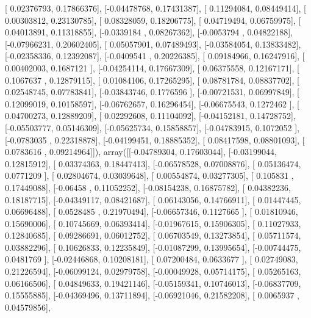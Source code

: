 \documentclass{article}
\begin{document}
       [ 0.02376793,  0.17866376],
       [-0.04478768,  0.17431387],
       [ 0.11294084,  0.08449414],
       [ 0.00303812,  0.23130785],
       [ 0.08328059,  0.18206775],
       [ 0.04719494,  0.06759975],
       [ 0.04013891,  0.11318855],
       [-0.0339184 ,  0.08267362],
       [-0.0053794 ,  0.04822188],
       [-0.07966231,  0.20602405],
       [ 0.05057901,  0.07489493],
       [-0.03584054,  0.13833482],
       [-0.02358336,  0.12392087],
       [-0.0409541 ,  0.20226385],
       [ 0.09184966,  0.16247916],
       [ 0.00402003,  0.1687121 ],
       [-0.04254114,  0.17667309],
       [ 0.06375558,  0.12167171],
       [ 0.1067637 ,  0.12879115],
       [ 0.01084106,  0.17265295],
       [ 0.08781784,  0.08837702],
       [ 0.02548745,  0.07783841],
       [-0.03843746,  0.1776596 ],
       [-0.00721531,  0.06997849],
       [ 0.12099019,  0.10158597],
       [-0.06762657,  0.16296454],
       [-0.06675543,  0.1272462 ],
       [ 0.04700273,  0.12889209],
       [ 0.02292608,  0.11104092],
       [-0.04152181,  0.14728752],
       [-0.05503777,  0.05146309],
       [-0.05625734,  0.15858857],
       [-0.04783915,  0.1072052 ],
       [-0.0783035 ,  0.22318878],
       [-0.04199451,  0.18885352],
       [ 0.08417598,  0.08801093],
       [ 0.0783616 ,  0.09214964]]), array([[-0.04789304,  0.17603044],
       [-0.03199044,  0.12815912],
       [ 0.03374363,  0.18447413],
       [-0.06578528,  0.07008876],
       [ 0.05136474,  0.0771209 ],
       [ 0.02804674,  0.03039648],
       [ 0.00554874,  0.03277305],
       [ 0.105831  ,  0.17449088],
       [-0.06458   ,  0.11052252],
       [-0.08154238,  0.16875782],
       [ 0.04382236,  0.18187715],
       [-0.04349117,  0.08421687],
       [ 0.06143056,  0.14766911],
       [ 0.01447445,  0.06696488],
       [ 0.0528485 ,  0.21970494],
       [-0.06657346,  0.1127665 ],
       [ 0.01810946,  0.15690006],
       [ 0.10745669,  0.06393414],
       [-0.01967615,  0.15906305],
       [ 0.11027933,  0.12840685],
       [ 0.09286691,  0.06012752],
       [ 0.06703549,  0.13273854],
       [ 0.05711574,  0.03882296],
       [ 0.10626833,  0.12235849],
       [-0.01087299,  0.13995654],
       [-0.00744475,  0.0481769 ],
       [-0.02446868,  0.10208181],
       [ 0.07200484,  0.0633677 ],
       [ 0.02749083,  0.21226594],
       [-0.06099124,  0.02979758],
       [-0.00049928,  0.05714175],
       [ 0.05265163,  0.06166506],
       [ 0.04849633,  0.19421146],
       [-0.05159341,  0.10746013],
       [-0.06837709,  0.15555885],
       [-0.04369496,  0.13711894],
       [-0.06921046,  0.21582208],
       [ 0.0065937 ,  0.04579856],
\end{document}
